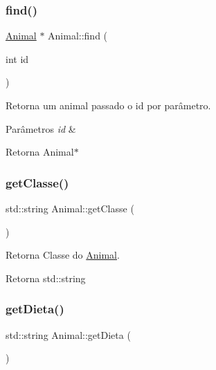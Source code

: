 \subsubsection{\texorpdfstring{find()}{find()}}
{\footnotesize\ttfamily \hyperlink{classAnimal}{Animal} $\ast$ Animal\+::find (\begin{DoxyParamCaption}\item[{int}]{id }\end{DoxyParamCaption})\hspace{0.3cm}{\ttfamily [static]}}



Retorna um animal passado o id por parâmetro. 


\begin{DoxyParams}{Parâmetros}
{\em id} & \\
\hline
\end{DoxyParams}
\begin{DoxyReturn}{Retorna}
Animal$\ast$ 
\end{DoxyReturn}
\mbox{\label{classAnimal_a22e54ff48117237f9a201f5eca0eea81}} 
\subsubsection{\texorpdfstring{get\+Classe()}{getClasse()}}
{\footnotesize\ttfamily std\+::string Animal\+::get\+Classe (\begin{DoxyParamCaption}{ }\end{DoxyParamCaption})}



Retorna Classe do \hyperlink{classAnimal}{Animal}. 

\begin{DoxyReturn}{Retorna}
std\+::string 
\end{DoxyReturn}
\mbox{\label{classAnimal_a6fcb9a0b8debecb58ca20dbf88bce329}} 
\subsubsection{\texorpdfstring{get\+Dieta()}{getDieta()}}
{\footnotesize\ttfamily std\+::string Animal\+::get\+Dieta (\begin{DoxyParamCaption}{ }\end{DoxyParamCaption})}



